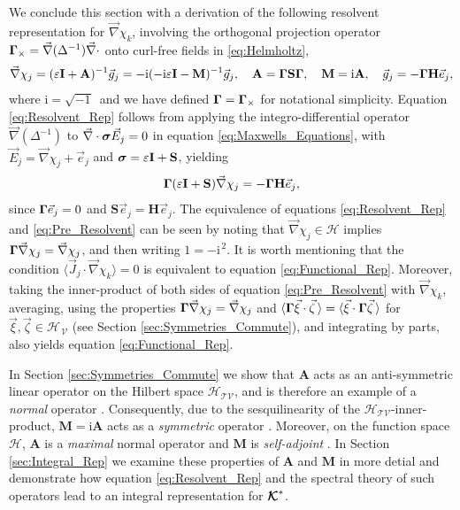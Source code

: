 \documentclass[11pt]{amsart}
\newcommand{\I}{\mathrm{i}}
\newcommand{\Mb}{\mathbf{M}}
\newcommand{\Hb}{\mathbf{H}}
\newcommand{\Ib}{\mathbf{I}}
\newcommand{\Sb}{\mathbf{S}}
\newcommand{\Ab}{\mathbf{A}}
\newcommand\Kbc{\mbox{\boldmath${\mathcal{K}}$}}
\newcommand{\Tc}{\mathcal{T}}
\newcommand{\Vc}{\mathcal{V}}
\newcommand{\Hs}{\mathscr{H}}
\newcommand\bsig{\mbox{\boldmath${\sigma}$}}
\newcommand\bGamma{\mbox{\boldmath${\Gamma}$}}
\begin{document}
We conclude this section with a derivation of the following resolvent
representation for $\vec{\nabla}\chi_k$, involving the orthogonal projection
operator $\bGamma_\times=\vec{\nabla}(\Delta^{-1})\vec{\nabla}\cdot$ onto curl-free fields in
\eqref{eq:Helmholtz},  
\begin{align}\label{eq:Resolvent_Rep}
  \vec{\nabla}\chi_j=(\varepsilon\Ib+\Ab)^{-1}\vec{g}_j
           =-\I(-\I\varepsilon\Ib-\Mb)^{-1}\vec{g}_j, \quad
  \Ab=\bGamma\Sb\bGamma, \quad
  \Mb=\I\Ab, \quad
  \vec{g}_j=-\bGamma\Hb\vec{e}_j,
\end{align}
%
where $\I=\sqrt{-1}\,$ and we have defined $\bGamma=\bGamma_\times$ for
notational simplicity. Equation \eqref{eq:Resolvent_Rep} follows from
applying the integro-differential operator $\vec{\nabla}(\Delta^{-1})$ to
$\vec{\nabla}\cdot\bsig\vec{E}_j=0$ in equation \eqref{eq:Maxwells_Equations},
with $\vec{E}_j=\vec{\nabla}\chi_j+\vec{e}_j$ and $\bsig=\varepsilon\Ib+\Sb$, yielding  
%
\begin{align}\label{eq:Pre_Resolvent}
  \bGamma(\varepsilon\Ib+\Sb)\vec{\nabla}\chi_j=-\bGamma\Hb\vec{e}_j,
\end{align}
%
since $\bGamma\vec{e}_j=0$ and $\Sb\vec{e}_j=\Hb\vec{e}_j$.
The equivalence of equations \eqref{eq:Resolvent_Rep} and
\eqref{eq:Pre_Resolvent} can be seen by noting that
$\vec{\nabla}\chi_j\in\Hs$ implies $\bGamma\vec{\nabla}\chi_j=\vec{\nabla}\chi_j$,
and then writing $1=-\I^{\,2}$. It is worth mentioning that the
condition $\langle\vec{J}_j\cdot\vec{\nabla}\chi_k\rangle=0$ is equivalent to equation
\eqref{eq:Functional_Rep}. Moreover, taking the inner-product of both
sides of equation \eqref{eq:Pre_Resolvent} with $\vec{\nabla}\chi_k$,
averaging, using the properties $\bGamma\vec{\nabla}\chi_j=\vec{\nabla}\chi_j$ and
$\langle\bGamma\vec{\xi}\cdot\vec{\zeta}\,\rangle=\langle\vec{\xi}\cdot\bGamma\vec{\zeta}\,\rangle$ for
$\vec{\xi},\vec{\zeta}\in\Hs_{\,\Vc}$ (see Section
\ref{sec:Symmetries_Commute}), and integrating by parts, also yields
equation  \eqref{eq:Functional_Rep}.     




In Section \ref{sec:Symmetries_Commute} we show that $\Ab$ acts as an
anti-symmetric linear operator on the Hilbert space $\Hs_{\Tc\Vc}$, 
and is therefore an example of a \emph{normal} operator
\cite{Stone:64}. Consequently, due to the sesquilinearity of the
$\Hs_{\Tc\Vc}$-inner-product, $\Mb=\I\Ab$ acts as a \emph{symmetric}
operator \cite{Reed-1980,Stone:64}. Moreover, on the function space 
$\Hs$, $\Ab$ is a \emph{maximal} normal operator and
$\Mb$ is \emph{self-adjoint} \cite{Stone:64}. In Section
\ref{sec:Integral_Rep} we examine these properties of $\Ab$ and $\Mb$ 
in more detial and demonstrate how equation \eqref{eq:Resolvent_Rep}
and the spectral theory of such operators lead to an integral
representation for $\Kbc^*$.     
\end{document}
